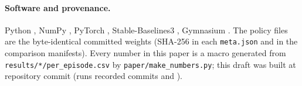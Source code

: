 \paragraph*{Software and provenance.} Python \VerPython, NumPy \VerNumpy, PyTorch \VerTorch, Stable-Baselines3 \VerSbthree, Gymnasium \VerGym. The policy files are the byte-identical committed weights (SHA-256 in each \texttt{meta.json} and in the comparison manifests). Every number in this paper is a macro generated from \texttt{results/*/per\_episode.csv} by \texttt{paper/make\_numbers.py}; this draft was built at repository commit \PaperCommit{} (runs recorded commits \ConfThreeCommit{} and \VFourPpoCommit{}).
